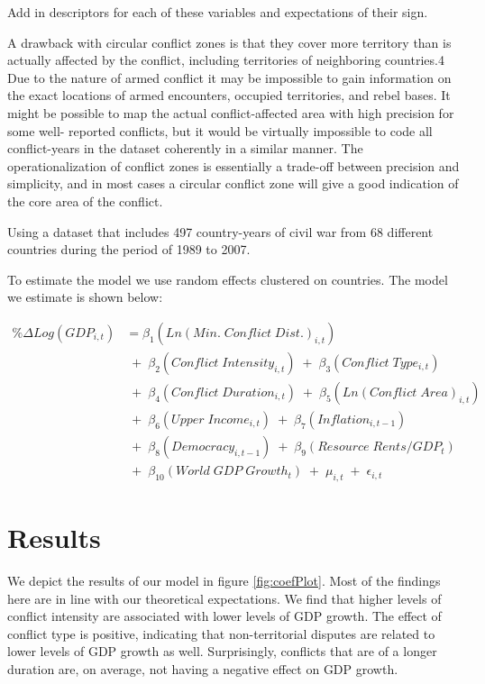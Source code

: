 Add in descriptors for each of these variables and expectations of their sign.

A drawback with circular conflict zones is that they cover more territory than is actually affected by the conflict, including territories of neighboring countries.4 Due to the nature of armed conflict it may be impossible to gain information on the exact locations of armed encounters, occupied territories, and rebel bases. It might be possible to map the actual conflict-affected area with high precision for some well- reported conflicts, but it would be virtually impossible to code all conflict-years in the dataset coherently in a similar manner. The operationalization of conflict zones is essentially a trade-off between precision and simplicity, and in most cases a circular conflict zone will give a good indication of the core area of the conflict.

Using a dataset that includes 497 country-years of civil war from 68 different countries during the period of 1989 to 2007. 

To estimate the model we use random effects clustered on countries. The model we estimate is shown below:

\begin{align*}
	\% \Delta Log(GDP_{i,t}) &= \beta_{1}(Ln(Min. \; Conflict \; Dist.)_{i,t}) \\
	& \;+\; \beta_{2}(Conflict \; Intensity_{i,t}) \;+\; \beta_{3}(Conflict \; Type_{i,t}) \\
	& \;+\; \beta_{4}(Conflict \; Duration_{i,t}) \;+\; \beta_{5}(Ln(Conflict \; Area)_{i,t}) \\	
	& \;+\; \beta_{6}(Upper \; Income_{i,t}) \;+\; \beta_{7}(Inflation_{i,t-1}) \\
	&  \;+\; \beta_{8}(Democracy_{i,t-1}) \;+\; \beta_{9}(Resource \; Rents/GDP_{t}) \\
	& \;+\; \beta_{10}(World \; GDP \; Growth_{t}) \;+\; \mu_{i,t} \;+\; \epsilon_{i,t}
\end{align*}

\section{Results}
\label{findings} 

We depict the results of our model in figure \ref{fig:coefPlot}. Most of the findings here are in line with our theoretical expectations. We find that higher levels of conflict intensity are associated with lower levels of GDP growth. The effect of conflict type is positive, indicating that non-territorial disputes are related to lower levels of GDP growth as well. Surprisingly, conflicts that are of a longer duration are, on average, not having a negative effect on GDP growth. 

